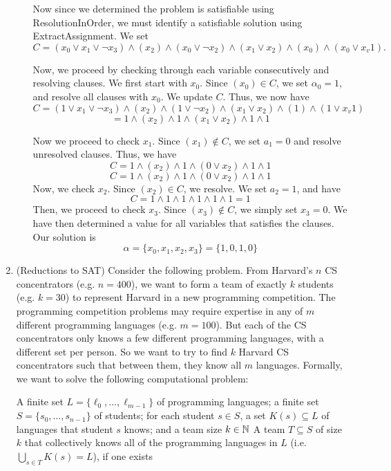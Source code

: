 \documentclass[11pt]{article}
\begin{document}
\begin{enumerate}
\begin{enumerate}
      Now since we determined the problem is satisfiable using ResolutionInOrder, we must identify a satisfiable solution using ExtractAssignment. We set 
      $$
      C = (x_0 \vee x_1 \vee \neg x_3) \wedge (x_2) \wedge (x_0 \vee \neg x_2) \wedge (x_1 \vee x_2) \wedge (x_0) \wedge (x_0 \vee x_v1).
      $$
      
      Now, we proceed by checking through each variable consecutively and resolving clauses. We first start with $x_0$. Since $(x_0) \in C$, we set $\alpha_0 = 1$, and resolve all clauses with $x_0$. We update $C$. Thus, we now have 
      $$
      C = (1 \vee x_1 \vee \neg x_3) \wedge (x_2) \wedge (1 \vee \neg x_2) \wedge (x_1 \vee x_2) \wedge (1) \wedge (1 \vee x_v1)
      $$
      $$
       = 1 \wedge (x_2) \wedge 1 \wedge (x_1 \vee x_2) \wedge 1 \wedge 1
      $$
      
      Now we proceed to check $x_1$. Since $(x_1) \notin C$, we set $a_1 = 0$ and resolve unresolved clauses. Thus, we have 
      $$
      C = 1 \wedge (x_2) \wedge 1 \wedge (0 \vee x_2) \wedge 1 \wedge 1
      $$
      $$
      C = 1 \wedge (x_2) \wedge 1 \wedge (0 \vee x_2) \wedge 1 \wedge 1
      $$
      Now, we check $x_2$. Since $(x_2) \in C$, we resolve. We set $a_2 = 1$, and have
      $$
      C = 1 \wedge 1 \wedge 1 \wedge 1 \wedge 1 \wedge 1 = 1
      $$
      Then, we proceed to check $x_3$. Since $(x_3) \notin C$, we simply set $x_3 = 0$. We have then determined a value for all variables that satisfies the clauses. Our solution is $$
      \alpha = \{x_0, x_1, x_2, x_3\} = \{1, 0, 1, 0\}
      $$
  \end{enumerate}
  
\item (Reductions to SAT)  Consider the following problem.  From Harvard's $n$ CS concentrators (e.g. $n=400$), we want to form a team of exactly $k$ students (e.g. $k=30$) to represent Harvard in a new programming competition.  The programming competition problems may require expertise in any of $m$ different programming languages (e.g. $m=100$).  But each of the CS concentrators only knows a few different programming languages, with a different set per person. So we want to try to find $k$ Harvard CS concentrators such that between them, they know all $m$ languages. Formally, we want to solve the following computational problem:

{A finite set $L=\{\ell_0,\ldots,\ell_{m-1}\}$ of programming languages; a finite set 
$S=\{s_0,\ldots,s_{n-1}\}$ of students; for each student $s\in S$, a set $K(s)\subseteq L$ of languages that student $s$ knows; and a team size $k\in \mathbb{N}$}
{A team $T\subseteq S$ of size $k$ that collectively knows all of the programming languages in $L$ (i.e. $\bigcup_{s\in T} K(s)=L$), if one exists}


\end{enumerate}
\end{document}
